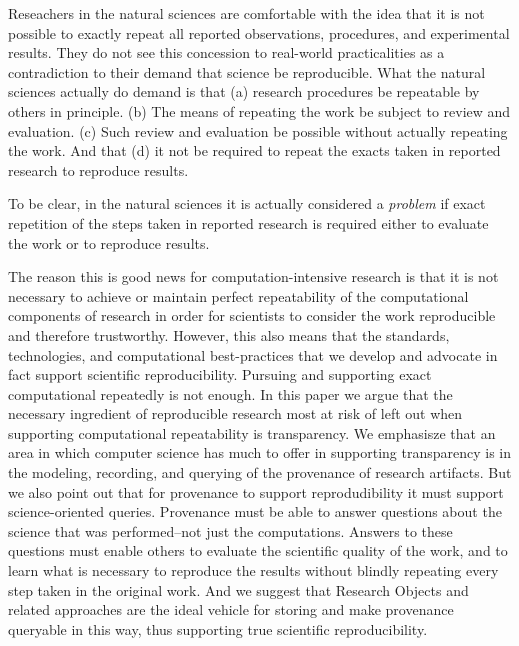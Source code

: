  Reseachers in the natural sciences are comfortable with the idea that it is not possible to exactly
	repeat all reported observations, procedures, and experimental results.
They do not see this concession to real-world practicalities as a contradiction to their demand that science be reproducible.
What the natural sciences actually do demand is that 
	(a) research procedures be repeatable by others in principle.
	(b) The means of repeating the work be subject to review and evaluation.  
	(c) Such review and evaluation be possible without actually repeating the work.
	And that (d) it not be required to repeat the exacts taken in reported research to reproduce results.

To be clear, in the natural sciences it is actually considered a \emph{problem} if exact repetition of the steps
	taken in reported research is required either to evaluate the work or to reproduce results.

The reason this is good news for computation-intensive research is that it is not necessary to achieve or 
	maintain perfect repeatability of the computational components of research in order for scientists to 
	consider the work reproducible and therefore trustworthy.
However, this also means that the standards, technologies, and computational best-practices that we develop and advocate
	in fact support scientific reproducibility.
Pursuing and supporting exact computational repeatedly is not enough.
In this paper we argue that the necessary ingredient of reproducible research most at risk of left out when supporting computational
	repeatability is transparency.
We emphasisze that an area in which computer science has much to offer in supporting transparency is in the modeling, recording, 
	and querying of the provenance of research artifacts.
But we also point out that for provenance to support reprodudibility it must support science-oriented queries.
Provenance must be able to answer questions about the science that was performed--not just the computations.
Answers to these questions must enable others to evaluate the scientific quality of the work, and to learn what is necessary to 
	reproduce the results without blindly repeating every step taken in the original work.
And we suggest that Research Objects and related approaches are the ideal vehicle for storing and make provenance queryable
	in this way, thus supporting true scientific reproducibility.